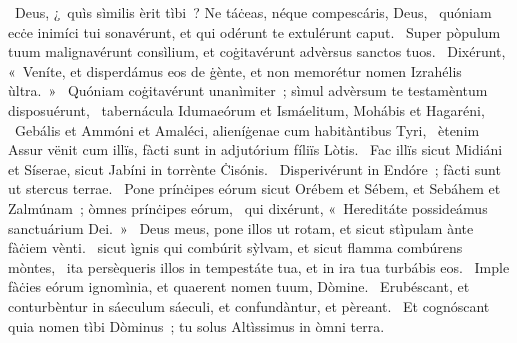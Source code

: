 ~Deus, ¿~quìs sìmilis èrit tìbi~? Ne táċeas, néque compescáris, Deus, 
~quóniam ecċe inimíci tui sonavérunt, et qui odérunt te extulérunt caput. 
~Super pòpulum tuum malignavérunt consìlium, et coġitavérunt advèrsus sanctos tuos. 
~Dixérunt, «~Veníte, et disperdámus eos de ġènte, et non memorétur nomen Izrahélis ùltra.~» 
~Quóniam coġitavérunt unanìmiter~; sìmul advèrsum te testamèntum disposuérunt, 
~tabernácula Idumaeórum et Ismáelitum, Mohábis et Hagaréni, 
~Gebális et Ammóni et Amaléci, alieníġenae cum habitàntibus Tyri, 
~ètenim Assur vënit cum illïs, fàcti sunt in adjutórium fíliïs Lòtis. 
~Fac illïs sicut Midiáni et Síserae, sicut Jabíni in torrènte Ċisónis. 
~Disperivérunt in Endóre~; fàcti sunt ut stercus terrae. 
~Pone prínċipes eórum sicut Orébem et Sébem, et Sebáhem et Zalmúnam~; òmnes prínċipes eórum, 
~qui dixérunt, «~Hereditáte possideámus sanctuárium Dei.~»
~Deus meus, pone illos ut rotam, et sicut stìpulam ànte fàċiem vènti. 
~sicut ìgnis qui combúrit sỳlvam, et sicut flamma combúrens mòntes, 
~ita persèqueris illos in tempestáte tua, et in ira tua turbábis eos. 
~Imple fàċies eórum ignomìnia, et quaerent nomen tuum, Dòmine. 
~Erubéscant, et conturbèntur in sáeculum sáeculi, et confundàntur, et pèreant. 
~Et cognóscant quia nomen tìbi Dòminus~; tu solus Altìssimus in òmni terra. 
